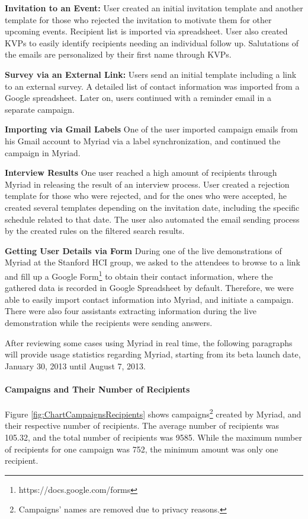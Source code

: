 \begin{compactitem}
	\item \textbf{Invitation to an Event:} User created an initial invitation template and another template for those who rejected the invitation to motivate them for other upcoming events. Recipient list is imported via spreadsheet. User also created \ac{KVP}s to easily identify recipients needing an individual follow up. Salutations of the emails are personalized by their first name through \ac{KVP}s.
	\item \textbf{Survey via an External Link:} Users send an initial template including a link to an external survey. A detailed list of contact information was imported from a Google spreadsheet. Later on, users continued with a reminder email in a separate campaign.
	\item \textbf{Importing via Gmail Labels} One of the user imported campaign emails from his Gmail account to Myriad via a label synchronization, and continued the campaign in Myriad.
	\item \textbf{Interview Results} One user reached a high amount of recipients through Myriad in releasing the result of an interview process. User created a rejection template for those who were rejected, and for the ones who were accepted, he created several templates depending on the invitation date, including the specific schedule related to that date. The user also automated the email sending process by the created rules on the filtered search results.
	\item \textbf{Getting User Details via Form} During one of the live demonstrations of Myriad at the Stanford \ac{HCI} group, we asked to the attendees to browse to a link and fill up a Google Form\footnote{https://docs.google.com/forms} to obtain their contact information, where the gathered data is recorded in Google Spreadsheet by default. Therefore, we were able to easily import contact information into Myriad, and initiate a campaign. There were also four assistants extracting information during the live demonstration while the recipients were sending answers.
\end{compactitem}
\vspace{1cm}

After reviewing some cases using Myriad in real time, the following paragraphs will provide usage statistics regarding Myriad, starting from its beta launch date, January 30, 2013 until August 7, 2013.

\paragraph{Campaigns and Their Number of Recipients} Figure \ref{fig:ChartCampaignsRecipients} shows campaigns\footnote{Campaigns' names are removed due to privacy reasons.} created by Myriad, and their respective number of recipients. The average number of recipients was 105.32, and the total number of recipients was 9585. While the maximum number of recipients for one campaign was 752, the minimum amount was only one recipient.

